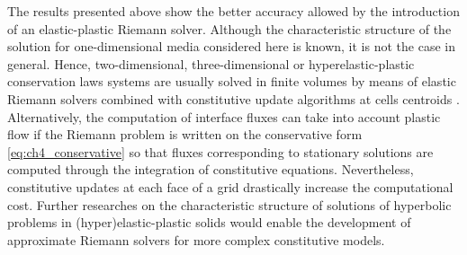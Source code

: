 The results presented above show the better accuracy allowed by the introduction of an elastic-plastic Riemann solver.
Although the characteristic structure of the solution for one-dimensional media considered here is known, it is not the case in general.
Hence, two-dimensional, three-dimensional or hyperelastic-plastic conservation laws systems are usually solved in finite volumes by means of elastic Riemann solvers combined with constitutive update algorithms at cells centroids \cite{Haider_FVM,Salbasivan_elastoplastoc,Maire_elastoplast}.
Alternatively, the computation of interface fluxes can take into account plastic flow if the Riemann problem is written on the conservative form \eqref{eq:ch4_conservative} so that fluxes corresponding to stationary solutions are computed through the integration of constitutive equations.
Nevertheless, constitutive updates at each face of a grid drastically increase the computational cost.
Further researches on the characteristic structure of solutions of hyperbolic problems in (hyper)elastic-plastic solids would enable the development of approximate Riemann solvers for more complex constitutive models.



